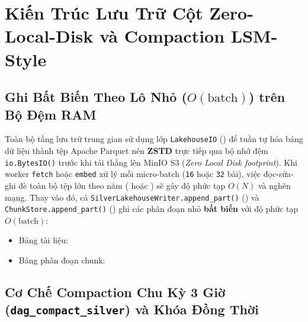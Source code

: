 
\section{Kiến Trúc Lưu Trữ Cột Zero-Local-Disk và Compaction LSM-Style}
\label{sec:ch2_zstd_compaction}

\subsection{Ghi Bất Biến Theo Lô Nhỏ (\texorpdfstring{$O(\text{batch})$}{O(batch)}) trên Bộ Đệm RAM}
\label{sec:ch2_append_part}

Toàn bộ tầng lưu trữ trung gian sử dụng lớp \texttt{LakehouseIO} () để tuần tự hóa bảng dữ liệu thành tệp Apache Parquet nén \textbf{ZSTD} trực tiếp qua bộ nhớ đệm \texttt{io.BytesIO()} trước khi tải thẳng lên MinIO S3 (\textit{Zero Local Disk footprint}). Khi worker \texttt{fetch} hoặc \texttt{embed} xử lý mỗi micro-batch (\texttt{16} hoặc \texttt{32} bài), việc đọc-sửa-ghi đè toàn bộ tệp lớn theo năm ( hoặc ) sẽ gây độ phức tạp $O(N)$ và nghẽn mạng. Thay vào đó, cả \texttt{SilverLakehouseWriter.append\_part()} () và \texttt{ChunkStore.append\_part()} () ghi các phân đoạn nhỏ \textbf{bất biến} với độ phức tạp $O(\text{batch})$:
\begin{itemize}
  \item Bảng tài liệu: 
  \item Bảng phân đoạn chunk: 
\end{itemize}

\subsection{Cơ Chế Compaction Chu Kỳ 3 Giờ (\texttt{dag\_compact\_silver}) và Khóa Đồng Thời}
\label{sec:ch2_compaction}

